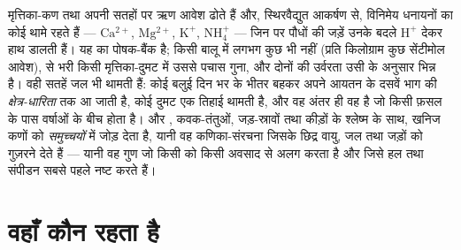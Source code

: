 \begin{proposition}[मृत्तिका और ह्यूमस क्यों मायने रखते हैं]\label{prop:b2:living-soil:cec}
मृत्तिका-कण तथा  अपनी सतहों पर ऋण आवेश ढोते हैं
और, स्थिरवैद्युत आकर्षण से, विनिमेय धनायनों का कोई  थामे रहते हैं
--- $\mathrm{Ca^{2+}}$, $\mathrm{Mg^{2+}}$, $\mathrm{K^{+}}$, $\mathrm{NH_4^{+}}$ --- जिन पर
पौधों की जड़ें उनके बदले $\mathrm{H^{+}}$ देकर हाथ डालती हैं। यह
\emph{}  का पोषक-बैंक है; किसी बालू में
लगभग कुछ भी नहीं (प्रति किलोग्राम कुछ सेंटीमोल आवेश),  से भरी किसी
मृत्तिका-दुमट में उससे पचास गुना, और दोनों की उर्वरता
उसी के अनुसार भिन्न है। वही सतहें जल भी थामती हैं: कोई बलुई 
दिन भर के भीतर बहकर अपने आयतन के दसवें भाग की \emph{क्षेत्र-धारिता} तक
आ जाती है, कोई दुमट एक तिहाई थामती है, और वह अंतर ही वह है जो किसी फ़सल के पास
वर्षाओं के बीच होता है। और , कवक-तंतुओं,
जड़-स्रावों तथा कीड़ों के श्लेष्म के साथ, खनिज कणों को
\emph{समुच्चयों} में जोड़ देता है, यानी वह कणिका-संरचना जिसके छिद्र वायु, जल
तथा जड़ों को गुज़रने देते हैं --- यानी वह गुण जो किसी  को किसी
अवसाद से अलग करता है और जिसे हल तथा संपीडन सबसे पहले नष्ट करते हैं।
\end{proposition}

\section{वहाँ कौन रहता है}

